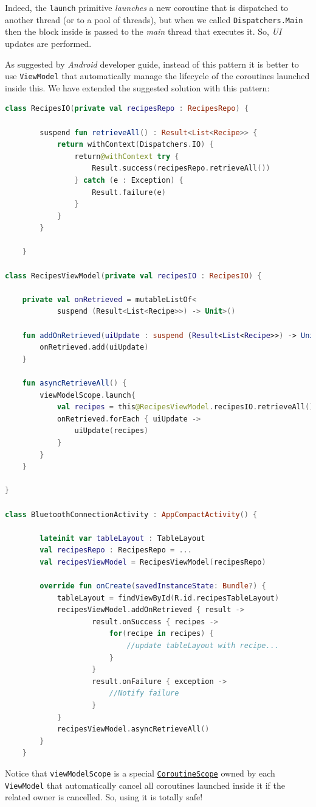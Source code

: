 Indeed, the \texttt{launch} primitive \textit{launches} a new coroutine that is dispatched to another thread (or to a pool of threads), but when we called \texttt{Dispatchers.Main} then the block inside is passed to the \textit{main} thread that executes it. So, \textit{UI} updates are performed.

As suggested by \textit{Android} developer guide, instead of this pattern it is better to use \texttt{ViewModel} that automatically manage the lifecycle of the coroutines launched inside this.
We have extended the suggested solution with this pattern:

\begin{lstlisting}[language=Kotlin]
	class RecipesIO(private val recipesRepo : RecipesRepo) {
		
		suspend fun retrieveAll() : Result<List<Recipe>> {
			return withContext(Dispatchers.IO) {
				return@withContext try {
					Result.success(recipesRepo.retrieveAll())
				} catch (e : Exception) {
					Result.failure(e)
				}
			}
		}
				
	}

class RecipesViewModel(private val recipesIO : RecipesIO) {
	
	private val onRetrieved = mutableListOf<
			suspend (Result<List<Recipe>>) -> Unit>()
	
	fun addOnRetrieved(uiUpdate : suspend (Result<List<Recipe>>) -> Unit) {
		onRetrieved.add(uiUpdate)
	}
	
	fun asyncRetrieveAll() {
		viewModelScope.launch{
			val recipes = this@RecipesViewModel.recipesIO.retrieveAll()
			onRetrieved.forEach { uiUpdate ->
				uiUpdate(recipes)
			}
		}
	}
	
}
	
class BluetoothConnectionActivity : AppCompactActivity() {
		
		lateinit var tableLayout : TableLayout
		val recipesRepo : RecipesRepo = ...
		val recipesViewModel = RecipesViewModel(recipesRepo)
		
		override fun onCreate(savedInstanceState: Bundle?) {
			tableLayout = findViewById(R.id.recipesTableLayout)
			recipesViewModel.addOnRetrieved { result ->
					result.onSuccess { recipes ->
						for(recipe in recipes) {
							//update tableLayout with recipe...
						}
					}
					result.onFailure { exception ->
						//Notify failure 
					}
			}
			recipesViewModel.asyncRetrieveAll()
		}
	}
\end{lstlisting}

Notice that \texttt{viewModelScope} is a special \href{https://kotlinlang.org/api/kotlinx.coroutines/kotlinx-coroutines-core/kotlinx.coroutines/-coroutine-scope/}{\texttt{CoroutineScope}} owned by each \texttt{ViewModel} that automatically cancel all coroutines launched inside it if the related owner is cancelled. So, using it is totally safe!


